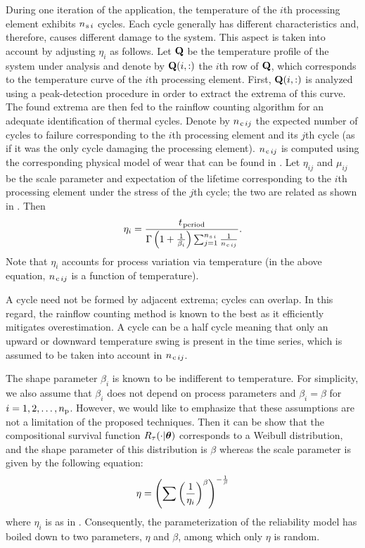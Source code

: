 During one iteration of the application, the temperature of the $i$th processing element exhibits $\nsegments[i]$ cycles.
Each cycle generally has different characteristics and, therefore, causes different damage to the system.
This aspect is taken into account by adjusting $\eta_i$ as follows.
Let $\mQ$ be the temperature profile of the system under analysis and denote by $\mQ(i, :)$ the $i$th row of $\mQ$, which corresponds to the temperature curve of the $i$th processing element.
First, $\mQ(i, :)$ is analyzed using a peak-detection procedure in order to extract the extrema of this curve.
The found extrema are then fed to the rainflow counting algorithm \cite{xiang2010} for an adequate identification of thermal cycles.
Denote by $\ncycles[ij]$ the expected number of cycles to failure corresponding to the $i$th processing element and its $j$th cycle (as if it was the only cycle damaging the processing element).
$\ncycles[ij]$ is computed using the corresponding physical model of wear that can be found in \cite{jedec, xiang2010}.
Let $\eta_{ij}$ and $\mu_{ij}$ be the scale parameter and expectation of the lifetime corresponding to the $i$th processing element under the stress of the $j$th cycle; the two are related as shown in .
Then \cite{ukhov2012, xiang2010}
\begin{equation} \elab{weibull-eta}
  \eta_i = \frac{\period}{\Gamma\left(1 + \frac{1}{\beta_i}\right) \sum_{j = 1}^{\nsegments[i]} \frac{1}{\ncycles[ij]}}.
\end{equation}
Note that $\eta_i$ accounts for process variation via temperature (in the above equation, $\ncycles[ij]$ is a function of temperature).

\begin{remark} 
A cycle need not be formed by adjacent extrema; cycles can overlap.
In this regard, the rainflow counting method is known to the best as it efficiently mitigates overestimation.
A cycle can be a half cycle meaning that only an upward or downward temperature swing is present in the time series, which is assumed to be taken into account in $\ncycles[ij]$.
\end{remark}

The shape parameter $\beta_i$ is known to be indifferent to temperature.
For simplicity, we also assume that $\beta_i$ does not depend on process parameters and $\beta_i = \beta$ for $i = 1, 2, \dotsc, \nprocs$.
However, we would like to emphasize that these assumptions are not a limitation of the proposed techniques.
Then it can be show that the compositional survival function $\survival_\T(\cdot | \pvw)$ corresponds to a Weibull distribution, and the shape parameter of this distribution is $\beta$ whereas the scale parameter is given by the following equation:
\begin{equation} \elab{compound-weibull-eta}
  \eta = \left(\sum \left( \frac{1}{\eta_i} \right)^\beta \right)^{-\frac{1}{\beta}}
\end{equation}
where $\eta_i$ is as in .
Consequently, the parameterization of the reliability model has boiled down to two parameters, $\eta$ and $\beta$, among which only $\eta$ is random.

